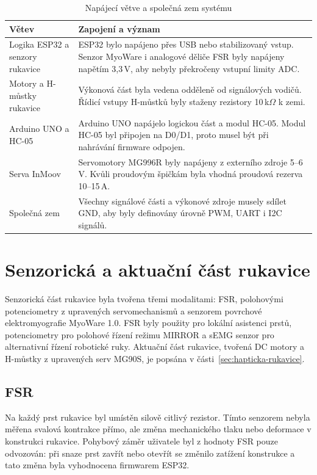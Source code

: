 \documentclass[FZS,DP]{tulthesis}
\begin{document}
\begin{table}[H]
\centering
\caption{Napájecí větve a společná zem systému}
\label{tab:napajeci-vetve}
\begin{tabular}{|p{}|p{}|}
\hline
\textbf{Větev} & \textbf{Zapojení a význam} \\
\hline
Logika ESP32 a senzory rukavice & ESP32 bylo napájeno přes USB nebo stabilizovaný vstup. Senzor MyoWare i analogové děliče FSR byly napájeny napětím 3,3\,V, aby nebyly překročeny vstupní limity ADC. \\
\hline
Motory a H-můstky rukavice & Výkonová část byla vedena odděleně od signálových vodičů. Řídicí vstupy H-můstků byly staženy rezistory 10\,k$\Omega$ k zemi. \\
\hline
Arduino UNO a HC-05 & Arduino UNO napájelo logickou část a modul HC-05. Modul HC-05 byl připojen na D0/D1, proto musel být při nahrávání firmware odpojen. \\
\hline
Serva InMoov & Servomotory MG996R byly napájeny z externího zdroje 5--6\,V. Kvůli proudovým špičkám byla vhodná proudová rezerva 10--15\,A. \\
\hline
Společná zem & Všechny signálové části a výkonové zdroje musely sdílet GND, aby byly definovány úrovně PWM, UART i I2C signálů. \\
\hline
\end{tabular}
\end{table}

\section{Senzorická a aktuační část rukavice}
\label{sec:snimaci-cast-rukavice}

Senzorická část rukavice byla tvořena třemi modalitami: FSR, polohovými potenciometry z upravených servomechanismů a senzorem povrchové elektromyografie MyoWare 1.0. FSR byly použity pro lokální asistenci prstů, potenciometry pro polohové řízení režimu MIRROR a sEMG senzor pro alternativní řízení robotické ruky. Aktuační část rukavice, tvořená DC motory a H-můstky z upravených serv MG90S, je popsána v části~\ref{sec:hapticka-rukavice}.

\subsection{FSR}
\label{subsec:fsr}

Na každý prst rukavice byl umístěn silově citlivý rezistor. Tímto senzorem nebyla měřena svalová kontrakce přímo, ale změna mechanického tlaku nebo deformace v konstrukci rukavice. Pohybový záměr uživatele byl z hodnoty FSR pouze odvozován: při snaze prst zavřít nebo otevřít se změnilo zatížení konstrukce a tato změna byla vyhodnocena firmwarem ESP32.
\end{document}
